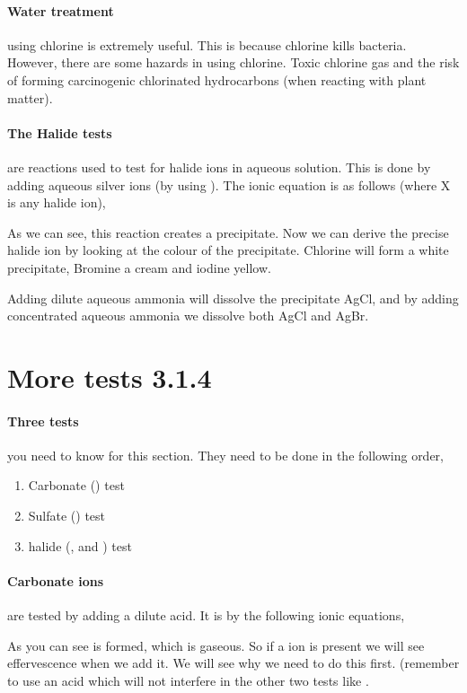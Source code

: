 	\paragraph{Water treatment} using chlorine is extremely useful.
	This is because chlorine kills bacteria.
	However, there are some hazards in using chlorine.
	Toxic chlorine gas and the risk of forming carcinogenic chlorinated hydrocarbons (when reacting with plant matter).
	
	\paragraph{The Halide tests} are reactions used to test for halide ions in aqueous solution.
	This is done by adding aqueous silver ions (by using ).
	The ionic equation is as follows (where X is any halide ion),
	
	\begin{center}
	\end{center}
	
	As we can see, this reaction creates a precipitate.
	Now we can derive the precise halide ion by looking at the colour of the precipitate.
	Chlorine will form a white precipitate, Bromine a cream and iodine yellow.
	
	Adding dilute aqueous ammonia will dissolve the precipitate AgCl, and by adding concentrated aqueous ammonia we dissolve both AgCl and AgBr.
	
\section{More tests 3.1.4}

	\paragraph{Three tests} you need to know for this section. They need to be done in the following order,
	\begin{enumerate}
		\item Carbonate () test
		\item Sulfate () test
		\item halide (, and ) test
	\end{enumerate}
	
	\paragraph{Carbonate ions} are tested by adding a dilute acid. It is by the following ionic equations,
	\begin{center}
	\end{center}
	As you can see  is formed, which is gaseous. So if a  ion is present we will see effervescence when we add it.
	We will see why we need to do this first.
	(remember to use an acid which will not interfere in the other two tests like .
	
